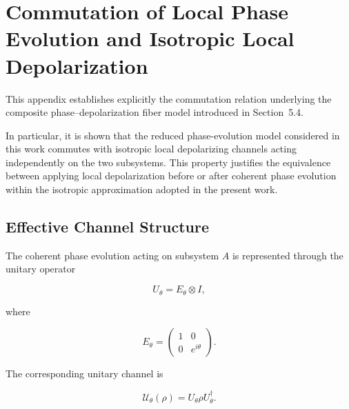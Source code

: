 
\section{Commutation of Local Phase Evolution and Isotropic Local Depolarization}

This appendix establishes explicitly the commutation relation underlying the composite phase--depolarization fiber model introduced in Section~5.4.

\medskip

In particular, it is shown that the reduced phase-evolution model considered in this work commutes with isotropic local depolarizing channels acting independently on the two subsystems. This property justifies the equivalence between applying local depolarization before or after coherent phase evolution within the isotropic approximation adopted in the present work.

\medskip


\subsection*{Effective Channel Structure}

The coherent phase evolution acting on subsystem \( A \) is represented through the unitary operator

\begin{equation}
U_{\theta}
=
E_{\theta}
\otimes
I,
\label{eq:appendix_phase_unitary}
\end{equation}

where

\begin{equation}
E_{\theta}
=
\begin{pmatrix}
1 & 0 \\
0 & e^{i\theta}
\end{pmatrix}.
\label{eq:appendix_single_qubit_phase_unitary}
\end{equation}

The corresponding unitary channel is

\begin{equation}
\mathcal{U}_{\theta}(\rho)
=
U_{\theta}\rho U_{\theta}^{\dagger}.
\label{eq:appendix_unitary_channel}
\end{equation}

